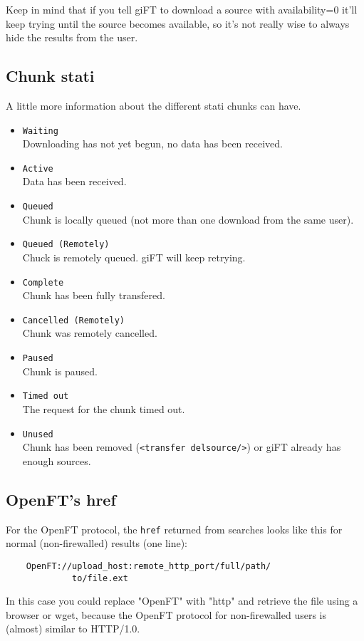 \documentclass[10pt]{article}
\begin{document}
Keep in mind that if you tell giFT to download a source with availability=0
it'll keep trying until the source becomes available, so it's not really wise
to always hide the results from the user.

\subsection{Chunk stati}
A little more information about the different stati chunks can have.
\begin{itemize}
\item\verb|Waiting|\\
Downloading has not yet begun, no data has been received.
\item\verb|Active|\\
Data has been received.
\item\verb|Queued|\\
Chunk is locally queued (not more than one download from the same user).
\item\verb|Queued (Remotely)|\\
Chuck is remotely queued. giFT will keep retrying.
\item\verb|Complete|\\
Chunk has been fully transfered.
\item\verb|Cancelled (Remotely)|\\
Chunk was remotely cancelled.
\item\verb|Paused|\\
Chunk is paused.
\item\verb|Timed out|\\
The request for the chunk timed out.
\item\verb|Unused|\\
Chunk has been removed (\verb|<transfer delsource/>|) or giFT already has enough sources.
\end{itemize}

\subsection{OpenFT's href}
For the OpenFT protocol, the \verb|href| returned from searches looks like this
for normal (non-firewalled) results (one line):
\begin{verbatim}
    OpenFT://upload_host:remote_http_port/full/path/
             to/file.ext
\end{verbatim}
In this case you could replace "OpenFT" with "http" and retrieve the file using
a browser or wget, because the OpenFT protocol for non-firewalled users is
(almost) similar to HTTP/1.0.
\end{document}
